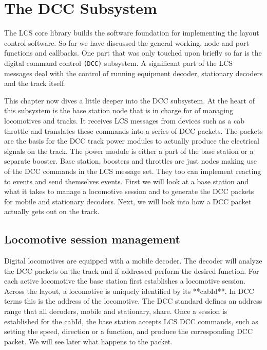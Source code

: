 \chapter{The DCC Subsystem}

The LCS core library builds the software foundation for implementing the layout control software. So far we have discussed the general working, node and port functions and callbacks. One part that was only touched upon briefly so far is the digital command control \texttt{(DCC)} subsystem. A significant part of the LCS messages deal with the control of running equipment decoder, stationary decoders and the track itself.

This chapter now dives a little deeper into the DCC subsystem. At the heart of this subsystem is the base station node that is in charge for of managing locomotives and tracks. It receives LCS messages from devices such as a cab throttle and translates these commands into a series of DCC packets. The packets are the basis for the DCC track power modules to actually produce the electrical signals on the track. The power module is either a part of the base station or a separate booster. Base station, boosters and throttles are just nodes making use of the DCC commands in the LCS message set. They too can implement reacting to events and send themselves events. First we will look at a base station and what it takes to manage a locomotive session and to generate the DCC packets for mobile and stationary decoders. Next, we will look into how a DCC packet actually gets out on the track.

\section{Locomotive session management}

Digital locomotives are equipped with a mobile decoder. The decoder will analyze the DCC packets on the track and if addressed perform the desired function. For each active locomotive the base station first establishes a locomotive session. Across the layout, a locomotive is uniquely identified by its **cabId**. In DCC terms this is the address of the locomotive. The DCC standard defines an address range that all decoders, mobile and stationary, share. Once a session is established for the cabId, the base station accepts LCS DCC commands, such as setting the speed, direction or a function, and produce the corresponding DCC packet. We will see later what happens to the packet.

